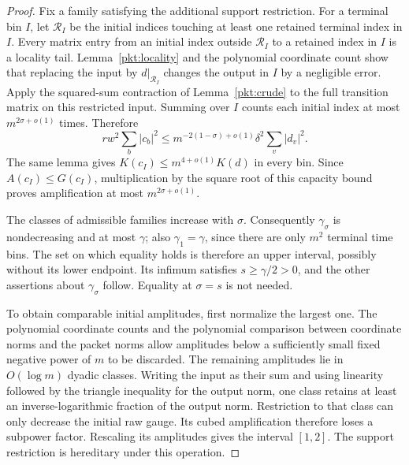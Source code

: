 \begin{proof}
Fix a family satisfying the additional support restriction.
For a terminal bin \(I\), let \(\mathcal R_I\) be the initial indices
touching at least one retained terminal index in \(I\). Every matrix
entry from an initial index outside \(\mathcal R_I\) to a retained
index in \(I\) is a locality tail. Lemma~\ref{pkt:locality} and the
polynomial coordinate count show that replacing the input by
\(d|_{\mathcal R_I}\) changes the output in \(I\) by a negligible
error. Apply the squared-sum contraction of Lemma~\ref{pkt:crude} to
the full transition matrix on this restricted input. Summing over
\(I\) counts each initial index at most \(m^{2\sigma+o(1)}\) times.
Therefore
\[
 r w^2\sum_b |c_b|^2
 \leq m^{-2(1-\sigma)+o(1)}\delta^2\sum_v|d_v|^2.
\]
The same lemma gives \(K(c_I)\leq m^{4+o(1)}K(d)\) in every bin.
Since \(A(c_I)\leq G(c_I)\), multiplication by the square root of this
capacity bound proves amplification at most \(m^{2\sigma+o(1)}\).

The classes of admissible families increase with \(\sigma\).
Consequently \(\gamma_\sigma\) is nondecreasing and at most \(\gamma\);
also \(\gamma_1=\gamma\), since there are only \(m^2\) terminal time
bins. The set on which equality holds is therefore an upper interval,
possibly without its lower endpoint. Its infimum satisfies
\(s\geq\gamma/2>0\), and the other assertions about
\(\gamma_\sigma\) follow. Equality at \(\sigma=s\) is not needed.

To obtain comparable initial amplitudes, first normalize the largest
one. The polynomial coordinate counts and the polynomial comparison
between coordinate norms and the packet norms allow amplitudes below
a sufficiently small fixed negative power of \(m\) to be discarded.
The remaining amplitudes lie in \(O(\log m)\) dyadic classes.
Writing the input as their sum and using linearity followed by the
triangle inequality for the output norm, one class retains at least
an inverse-logarithmic fraction of the output norm. Restriction to
that class can only decrease the initial raw gauge. Its cubed
amplification therefore loses a subpower factor. Rescaling its
amplitudes gives the interval \([1,2]\). The support restriction is
hereditary under this operation.
\end{proof}

